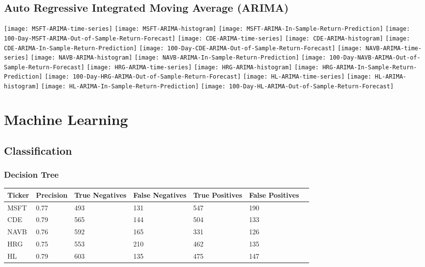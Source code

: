 \subsection{Auto Regressive Integrated Moving Average (ARIMA)}
\texttt{[image: MSFT-ARIMA-time-series]}
\texttt{[image: MSFT-ARIMA-histogram]}
\texttt{[image: MSFT-ARIMA-In-Sample-Return-Prediction]}
\texttt{[image: 100-Day-MSFT-ARIMA-Out-of-Sample-Return-Forecast]}
\texttt{[image: CDE-ARIMA-time-series]}
\texttt{[image: CDE-ARIMA-histogram]}
\texttt{[image: CDE-ARIMA-In-Sample-Return-Prediction]}
\texttt{[image: 100-Day-CDE-ARIMA-Out-of-Sample-Return-Forecast]}
\texttt{[image: NAVB-ARIMA-time-series]}
\texttt{[image: NAVB-ARIMA-histogram]}
\texttt{[image: NAVB-ARIMA-In-Sample-Return-Prediction]}
\texttt{[image: 100-Day-NAVB-ARIMA-Out-of-Sample-Return-Forecast]}
\texttt{[image: HRG-ARIMA-time-series]}
\texttt{[image: HRG-ARIMA-histogram]}
\texttt{[image: HRG-ARIMA-In-Sample-Return-Prediction]}
\texttt{[image: 100-Day-HRG-ARIMA-Out-of-Sample-Return-Forecast]}
\texttt{[image: HL-ARIMA-time-series]}
\texttt{[image: HL-ARIMA-histogram]}
\texttt{[image: HL-ARIMA-In-Sample-Return-Prediction]}
\texttt{[image: 100-Day-HL-ARIMA-Out-of-Sample-Return-Forecast]}

\section{Machine Learning}

\subsection{Classification}

\subsubsection{Decision Tree}

\begin{center}
    \begin{tabular}{ | l | l | l | | l | l | l | p{5cm} |}
    \hline
    Ticker & Precision & True Negatives & False Negatives & True Positives & False Positives \\ \hline
    MSFT & 0.77 & 493 & 131 & 547 & 190 \\ \hline
    CDE & 0.79 & 565 & 144 & 504 & 133 \\ \hline
    NAVB & 0.76 & 592 & 165 & 331 & 126 \\ \hline
    HRG & 0.75 & 553 & 210 & 462 & 135 \\ \hline
    HL & 0.79 & 603 & 135 & 475 & 147 \\
    \hline
    \end{tabular}
\end{center}

